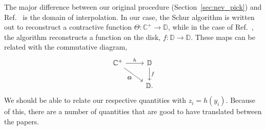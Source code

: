 The major difference between our original procedure (Section~\ref{sec:nev_pick}) and Ref.~\cite{https://doi.org/10.48550/arxiv.1405.3578} is the domain of interpolation. In our case, the Schur algorithm is written out to reconstruct a contractive function $\Theta : \mathbb C^+\rightarrow\mathbb D$, while in the case of Ref.~\cite{https://doi.org/10.48550/arxiv.1405.3578}, the algorithm reconstructs a function on the disk, $f : \mathbb D\rightarrow\mathbb D$. These maps can be related with the commutative diagram,
\begin{equation}\begin{tikzcd}
	\mathbb C^+ \arrow[r, "h"] \arrow[dr, "\Theta"'] & \mathbb D\arrow[d, "f"] \\
	& \mathbb D.
\end{tikzcd}\end{equation}
We should be able to relate our respective quantities with $z_i = h(y_i)$. Because of this, there are a number of quantities that are good to have translated between the papers.

